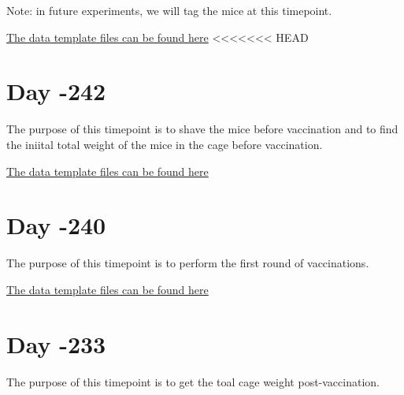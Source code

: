 \documentclass[]{book}
\begin{document}
Note: in future experiments, we will tag the mice at this timepoint.

\href{https://github.com/lyonsm7/impactb_book/raw/master/file_collection_templates/Base_Period/BP_T-247.xlsx}{The
data template files can be found here}
<<<<<<< HEAD

\chapter{Day -242}\label{day--242}

The purpose of this timepoint is to shave the mice before vaccination
and to find the iniital total weight of the mice in the cage before
vaccination.

\href{https://github.com/lyonsm7/impactb_book/raw/master/file_collection_templates/Base_Period/BP_T-242.xlsx}{The
data template files can be found here}

\chapter{Day -240}\label{day--240}

The purpose of this timepoint is to perform the first round of
vaccinations.

\href{https://github.com/lyonsm7/impactb_book/raw/master/file_collection_templates/Base_Period/BP_T-240.xlsx}{The
data template files can be found here}

\chapter{Day -233}\label{day--233}

The purpose of this timepoint is to get the toal cage weight
post-vaccination.
\end{document}
